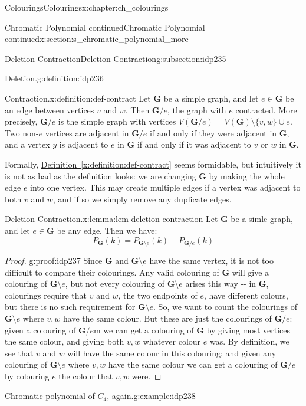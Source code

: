 \documentclass[oneside,10pt,]{book}
\newcommand{\xreffont}{\relax}
\numberwithin{equation}{section}
\newcommand{\bfG}{\mathbf{G}}
\begin{document}
\begin{chapterptx}{Colourings}{}{Colourings}{}{}{x:chapter:ch_colourings}
\begin{sectionptx}{Chromatic Polynomial continued}{}{Chromatic Polynomial continued}{}{}{x:section:s_chromatic_polynomial_more}
\begin{subsectionptx}{Deletion-Contraction}{}{Deletion-Contraction}{}{}{g:subsection:idp235}
\begin{definition}{Deletion.}{g:definition:idp236}
\end{definition}
\begin{definition}{Contraction.}{x:definition:def-contract}%
Let \(\bfG\) be a simple graph, and let \(e\in \bfG\) be an edge between vertices \(v\) and \(w\).  Then \(\bfG/e\), the graph with \(e\) contracted.  More precisely, \(\bfG/e\) is the simple graph with vertices \(V(\bfG/e)=V(\bfG)\setminus \{v,w\}\cup {e}\).  Two non-\(e\) vertices are adjacent in \(\bfG/e\) if and only if they were adjacent in \(\bfG\), and a vertex \(y\) is adjacent to \(e\) in \(\bfG\) if and only if it was adjacent to \(v\) or \(w\) in \(\bfG\).%
\end{definition}
Formally, \hyperref[x:definition:def-contract]{Definition~{\xreffont\ref{x:definition:def-contract}}} seems formidable, but intuitively it is not as bad as the definition looks: we are changing \(\bfG\) by making the whole edge \(e\) into one vertex.  This may create multiple edges if a vertex was adjacent to both \(v\) and \(w\), and if so we simply remove any duplicate edges.%
\begin{lemma}{Deletion-Contraction.}{}{x:lemma:lem-deletion-contraction}%
Let \(\bfG\) be a simle graph, and let \(e\in \bfG\) be any edge.  Then we have:%
%
\begin{equation*}
P_\bfG(k)=P_{\bfG\setminus e}(k)-P_{\bfG/e}(k)
\end{equation*}
\end{lemma}
\begin{proof}{}{g:proof:idp237}
Since \(\bfG\) and \(\bfG\setminus e\) have the same vertex, it is not too difficult to compare their colourings.  Any valid colouring of \(\bfG\) will give a colouring of \(\bfG\setminus e\), but not every colouring of \(\bfG\setminus e\) arises this way -{}-{} in \(\bfG\), colourings require that \(v\) and \(w\), the two endpoints of \(e\), have different colours, but there is no such requirement for \(\bfG\setminus e\).  So, we want to count the colourings of \(\bfG\setminus e\) where \(v,w\) have the same colour.  But these are just the colourings of \(\bfG/e\): given a colouring of \(\bfG/e\)m we can get a colouring of \(\bfG\) by giving most vertices the same colour, and giving both \(v,w\) whatever colour \(e\) was.  By definition, we see that \(v\) and \(w\) will have the same colour in this colouring; and given any colouring of \(\bfG\setminus e\) where \(v,w\) have the same colour we can get a colouring of \(\bfG/e\) by colouring \(e\) the colour that \(v,w\) were.%
\end{proof}
\begin{example}{Chromatic polynomial of \(C_4\), again.}{g:example:idp238}%

\end{example}
\end{subsectionptx}
\end{sectionptx}
\end{chapterptx}
\end{document}
